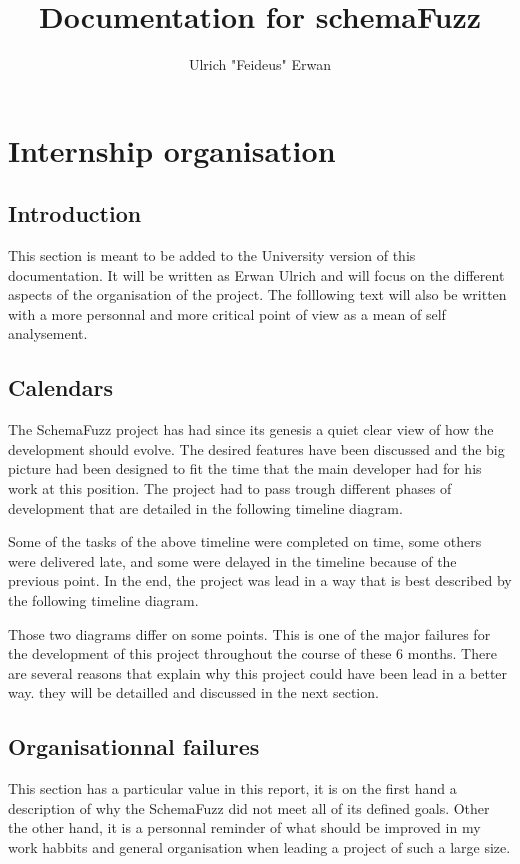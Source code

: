 \documentclass{article}
\title{Documentation for schemaFuzz}
\author{Ulrich "Feideus" Erwan}
\begin{document}
\section{Internship organisation}
	\subsection{Introduction}

This section is meant to be added to the University version of this documentation. It will be written as Erwan Ulrich and will focus on the different aspects of the organisation of the project. The folllowing text will also be written with a more personnal and more critical point of view as a mean of self analysement.

	\subsection{Calendars}
	
The	SchemaFuzz project has had since its genesis a quiet clear view of how the development should evolve. The desired features have been discussed and the big picture had been designed to fit the time that the main developer had for his work at this position.
The project had to pass trough different phases of development that are detailed in the following timeline diagram. %

Some of the tasks of the above timeline were completed on time, some others were delivered late, and some were delayed in the timeline because of the previous point.
In the end, the project was lead in a way that is best described by the following timeline diagram.    %

Those two diagrams differ on some points. This is one of the major failures for the development of this project throughout the course of these 6 months. 
There are several reasons that explain why this project could have been lead in a better way.
they will be detailled and discussed in the next section. 

	\subsection{Organisationnal failures}
This section has a particular value in this report, it is on the first hand a description of why the SchemaFuzz did not meet all of its defined goals.
Other the other hand, it is a personnal reminder of what should be improved in my work habbits and general organisation when leading a project of such a large size. 
	
\end{document}
